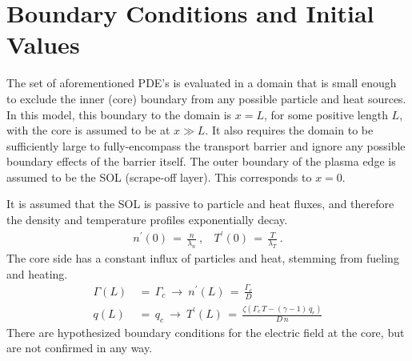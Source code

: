 \section{Boundary Conditions and Initial Values}\label{sec:boundary_conditions}
The set of aforementioned PDE's is evaluated in a domain that is small enough to exclude the inner (core) boundary from any possible particle and heat sources.
In this model, this boundary to the domain is $x = L$, for some positive length $L$, with the core is assumed to be at $x \gg L$.
It also requires the domain to be sufficiently large to fully-encompass the transport barrier and ignore any possible boundary effects of the barrier itself.
The outer boundary of the plasma edge is assumed to be the SOL (scrape-off layer).
This corresponds to $x = 0$.

It is assumed that the SOL is passive to particle and heat fluxes, and therefore the density and temperature profiles exponentially decay.
\begin{align} %
	n^\prime(0) \,=\, \frac{n}{\lambda_n}~, ~~~~
		T^\prime(0) \,=\, \frac{T}{\lambda_T}~.\label{eq:nT_SOL_boundary}
\end{align}
The core side has a constant influx of particles and heat, stemming from fueling and heating.
\begin{align} %
	\Gamma(L) \,&=\, \Gamma_c ~\longrightarrow~ n^\prime(L)
		\,=\, \frac{\Gamma_c}{D} \label{eq:core_particle_flux}\\
	q(L) \,&=\, q_c ~\longrightarrow~ T^\prime(L) \,=\, \frac{\zeta(
		\Gamma_c \, T - (\gamma - 1)\,q_c)}{D \, n} \label{eq:core_heat_flux}
\end{align}
There are hypothesized boundary conditions for the electric field at the core, but are not confirmed in any way.

